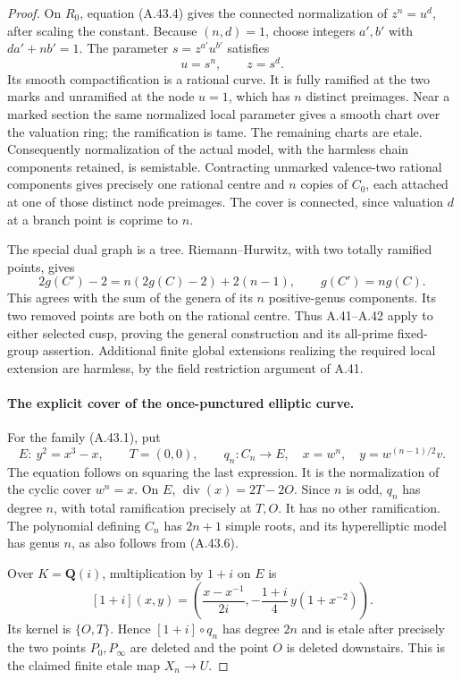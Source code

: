 \begin{proof}
On \(R_0\), equation (A.43.4) gives the connected
normalization of
\(z^n=u^d\), after scaling the constant. Because
\((n,d)=1\), choose integers \(a',b'\) with
\(da'+nb'=1\). The parameter
\(s=z^{a'}u^{b'}\) satisfies
\[
                           u=s^n,\qquad z=s^d.
                                                               \tag{A.43.5}
\]
Its smooth compactification is a rational curve. It is
fully ramified at the two marks and unramified at the
node \(u=1\), which has \(n\) distinct preimages.
Near a marked section the same normalized local
parameter gives a smooth chart over the valuation
ring; the ramification is tame. The remaining charts
are etale. Consequently normalization of the actual
model, with the harmless chain components retained,
is semistable. Contracting unmarked valence-two
rational components gives precisely one rational
centre and \(n\) copies of \(C_0\), each attached
at one of those distinct node preimages. The cover
is connected, since valuation \(d\) at a branch
point is coprime to \(n\).

The special dual graph is a tree. Riemann--Hurwitz,
with two totally ramified points, gives
\[
       2g(C')-2=n(2g(C)-2)+2(n-1),
                          \qquad g(C')=n g(C).       \tag{A.43.6}
\]
This agrees with the sum of the genera of its \(n\)
positive-genus components. Its two removed points
are both on the rational centre. Thus A.41--A.42
apply to either selected cusp, proving the general
construction and its all-prime fixed-group assertion.
Additional finite global extensions realizing the
required local extension are harmless, by the field
restriction argument of A.41.

\paragraph{The explicit cover of the once-punctured elliptic curve.}
For the family (A.43.1), put
\[
 E:\ y^2=x^3-x,\qquad T=(0,0),
 \qquad q_n:C_n\longrightarrow E,
          \quad x=w^n,\quad y=w^{(n-1)/2}v.           \tag{A.43.7}
\]
The equation follows on squaring the last expression.
It is the normalization of the cyclic cover \(w^n=x\).
On \(E\),
\(\operatorname{div}(x)=2T-2O\). Since \(n\)
is odd, \(q_n\) has degree \(n\), with total
ramification precisely at \(T,O\). It has no other
ramification. The polynomial defining \(C_n\) has
\(2n+1\) simple roots, and its hyperelliptic model
has genus \(n\), as also follows from (A.43.6).

Over \(K=\mathbf Q(i)\), multiplication by \(1+i\)
on \(E\) is
\[
 [1+i](x,y)=
 \left(\frac{x-x^{-1}}{2i},
             -\frac{1+i}{4}\,y(1+x^{-2})\right).
                                                               \tag{A.43.8}
\]
Its kernel is \(\{O,T\}\). Hence \([1+i]\circ q_n\)
has degree \(2n\) and is etale after precisely the
two points \(P_0,P_\infty\) are deleted and the
point \(O\) is deleted downstairs. This is the
claimed finite etale map \(X_n\to U\).


\end{proof}

